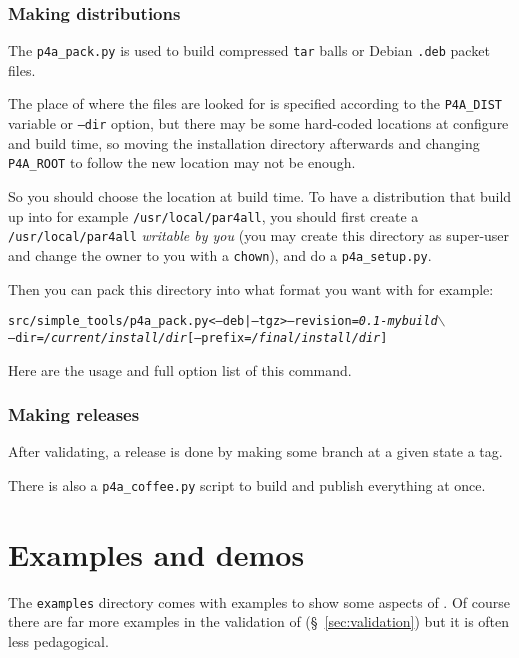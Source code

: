\documentclass[a4paper]{article}
\begin{document}
\subsubsection{Making distributions}
\label{sec:making-distributions}

The \verb|p4a_pack.py| is used to build compressed \texttt{tar} balls or Debian
\texttt{.deb} packet files.

The place of where the \Apfa files are looked for is specified according
to the \verb|P4A_DIST| variable or \texttt{--dir} option, but there may be
some hard-coded locations at configure and build time, so moving the
installation directory afterwards and changing \verb|P4A_ROOT| to follow
the new location may not be enough.

So you should choose the location at build time. To have a distribution
that build up into for example \texttt{/usr/local/par4all}, you should
first create a \texttt{/usr/local/par4all} \emph{writable by you} (you may
create this directory as super-user and change the owner to you with a
\texttt{chown}), and do a \verb|p4a_setup.py|.

Then you can pack this directory into what format you want with for
example:
\begin{alltt}
src/simple_tools/p4a_pack.py <--deb|--tgz> --revision=\emph{0.1-mybuild} \(\backslash\)
  --dir=\emph{/current/install/dir} [--prefix=\emph{/final/install/dir}]
\end{alltt}

Here are the usage and full option list of this command.




\subsubsection{Making releases}
\label{sec:releases}

After validating, a release is done by making some branch at a given state
a tag.

There is also a \verb|p4a_coffee.py| script to build and publish everything
at once.




\section{Examples and demos}
\label{sec:examples-demos}

The \texttt{examples} directory comes with examples to show some aspects
of \Apfa. Of course there are far more examples in the validation of \Apfa
(\S~\ref{sec:validation}) but it is often less pedagogical.
\end{document}
